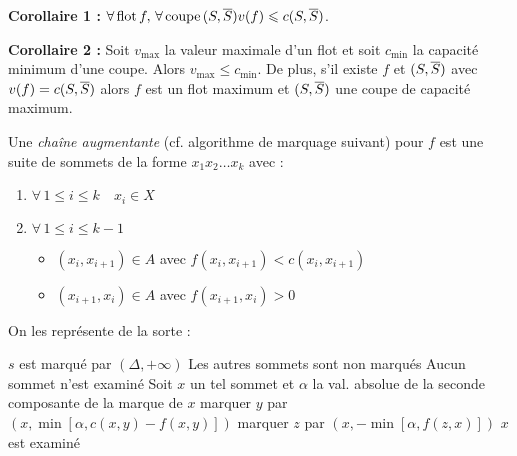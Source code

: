 \documentclass[a4paper, 8pt]{article}
\begin{document}
\begin{multicols*}{3}
\textbf{Corollaire 1 :} $\forall\,\text{flot}\,f, \,\forall\,\text{coupe}\,(S,\overline{S})\\v(f) \leqslant c(S,\overline{S})$.

\textbf{Corollaire 2 :} Soit $v_{\text{max}}$ la valeur maximale d'un flot et soit $c_{\text{min}}$ la capacité minimum d'une coupe. Alors $v_{\text{max}} \leqslant c_{\text{min}}$. De plus, s'il existe $f$ et $(S,\overline{S})$ avec $v(f) = c(S,\overline{S})$ alors $f$ est un flot maximum et $(S,\overline{S})$ une coupe de capacité maximum.

Une \textit{chaîne augmentante} (cf. algorithme de marquage suivant) pour $f$ est une suite de sommets de la forme $x_1x_2\ldots x_k$ avec :
\begin{enumerate}
\item $\forall\, 1 \leqslant i \leqslant k\quad x_i \in X$
\item $\forall\, 1 \leqslant i \leqslant k-1$
	\begin{itemize}
	\item $(x_i,x_{i+1})\in A$ avec $f(x_i,x_{i+1}) < c(x_i,x_{i+1})$
	\item $(x_{i+1},x_i)\in A$ avec $f (x_{i+1},x_i) > 0$
	\end{itemize}
\end{enumerate}

On les représente de la sorte :
\begin{center}
\end{center}

\begin{algorithm}[H]
 $s$ est marqué par $(\Delta,+\infty)$ \;
 Les autres sommets sont non marqués \;
 Aucun sommet n'est examiné \;
 {
 	 Soit $x$ un tel sommet et $\alpha$ la val. absolue de la seconde composante de la marque de $x$ \;
 	 {
 	 	{
 	 		marquer $y$ par \footnotesize{$\left(x,\min\left[\alpha,c(x,y)-f(x,y)\right]\right)$} \;
 	 	}
 	 }
 	 {
 	 	{
 	 		marquer $z$ par \footnotesize{$\left(x,-\min\left[\alpha,f(z,x)\right]\right)$} \;
 	 	}
 	 }
 	 $x$ est examiné \;
 }
 

\end{algorithm}
\end{multicols*}
\end{document}

